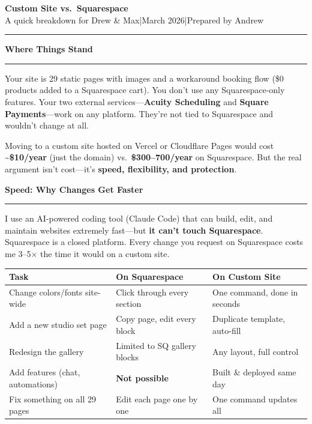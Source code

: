 \documentclass[10pt,letterpaper]{article}
\newcommand{\sectionhead}[1]{%
  \vspace{10pt}%
  {\headingfont\Large\bfseries #1}\\[-3pt]%
  {\color{wwsAccent}\rule{\linewidth}{1.5pt}}%
  \vspace{2pt}%
}
\begin{document}
\begin{center}
{\headingfont\LARGE\bfseries Custom Site vs.\ Squarespace}\\[2pt]
{\color{wwsDark}\small A quick breakdown for Drew \& Max\quad|\quad March 2026\quad|\quad Prepared by Andrew}
\end{center}

\vspace{-2pt}
{\color{wwsGray}\rule{\linewidth}{0.5pt}}

\sectionhead{Where Things Stand}

Your site is 29 static pages with images and a workaround booking flow (\$0 products added to a Squarespace cart). You don't use any Squarespace-only features. Your two external services---\textbf{Acuity Scheduling} and \textbf{Square Payments}---work on any platform. They're not tied to Squarespace and wouldn't change at all.

Moving to a custom site hosted on Vercel or Cloudflare Pages would cost \textbf{\textasciitilde\$10/year} (just the domain) vs.\ \textbf{\$300--700/year} on Squarespace. But the real argument isn't cost---it's \textbf{speed, flexibility, and protection}.

\sectionhead{Speed: Why Changes Get Faster}

I use an AI-powered coding tool (Claude Code) that can build, edit, and maintain websites extremely fast---but \textbf{it can't touch Squarespace}. Squarespace is a closed platform. Every change you request on Squarespace costs me 3--5$\times$ the time it would on a custom site.

\vspace{2pt}
\begin{tabularx}{\linewidth}{@{}p{3.8cm} X X@{}}
\toprule
\textbf{Task} & \textbf{On Squarespace} & \textbf{On Custom Site} \\
\midrule
Change colors/fonts site-wide & Click through every section & One command, done in seconds \\
Add a new studio set page & Copy page, edit every block & Duplicate template, auto-fill \\
Redesign the gallery & Limited to SQ gallery blocks & Any layout, full control \\
Add features (chat, automations) & \textcolor{redBad}{\textbf{Not possible}} & Built \& deployed same day \\
Fix something on all 29 pages & Edit each page one by one & One command updates all \\
\bottomrule
\end{tabularx}
\end{document}
